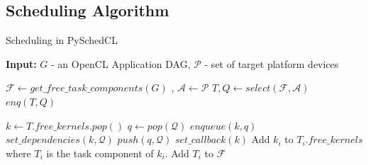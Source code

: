 	\subsection{Scheduling Algorithm}
    \begin{algorithm}[H]
		
		\caption{Scheduling in PySchedCL\label{algo:dispatch}}
		\textbf{Input: } $G$ - an OpenCL Application DAG, $\mathcal{P}$ - set of target platform devices
		\begin{algorithmic}[1]
			\State $\mathcal{F} \leftarrow get\_free\_task\_components(G)$ , $\mathcal{A} \leftarrow \mathcal{P}$
			\State $T,Q \leftarrow select(\mathcal{F},\mathcal{A})$
			\State $enq(T,Q)$
			\EndWhile
			\EndWhile
			\EndProcedure

			
			\State $k \leftarrow T.free\_kernels.pop()$
			\State $q \leftarrow pop(\mathcal{Q})$
			\State $enqueue(k,q)$
			\State $set\_dependencies(k,\mathcal{Q})$
			\State $push(q,\mathcal{Q})$
				\State $set\_callback(k)$
			\EndIf
					\State Add $k_i$ to $T_i.free\_kernels$ where $T_i$ is the task component of $k_i$.
						\State Add $T_i$ to $\mathcal{F}$
					\EndIf
				\EndIf
			\EndFor
			\EndWhile
			\EndFunction
		\end{algorithmic}
	\end{algorithm}

    

